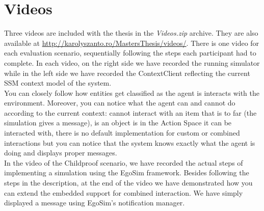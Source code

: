 \chapter{Videos}\label{ch:videos}
Three videos are included with the thesis in the \emph{Videos.zip} archive. They are also available at \url{http://karolyszanto.ro/MastersThesis/videos/}. There is one video for each evaluation scenario, sequentially following the steps each participant had to complete. In each video, on the right side we have recorded the running simulator while in the left side we have recorded the ContextClient reflecting the current SSM context model of the system.\\

You can closely follow how entities get classified as the agent is interacts with the environment. Moreover, you can notice what the agent can and cannot do according to the current context: cannot interact with an item that is to far (the simulation gives a message), is an object is in the Action Space it can be interacted with, there is no default implementation for custom or combined interactions but you can notice that the system knows exactly what the agent is doing and displays proper messages.\\

In the video of the Childproof scenario, we have recorded the actual steps of implementing a simulation using the EgoSim framework. Besides following the steps in the description, at the end of the video we have demonstrated how you can extend the embedded support for combined interaction. We have simply displayed a message using EgoSim's notification manager.